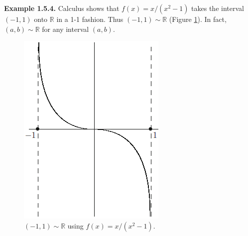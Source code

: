 \documentclass{article}
\begin{document}
        \textbf{Example 1.5.4.} Calculus shows that $f(x) = x/(x^2-1)$ takes the interval $(-1,1)$ onto $\mathbb{R}$ in a 1-1 fashion. Thus $(-1,1) \sim \mathbb{R}$ (Figure \ref{exp1.5.4}). In fact, $(a,b) \sim \mathbb{R}$ for any interval $(a,b)$.
        \begin{figure}[ht!]
            \centering
            \includegraphics[width=0.35\linewidth]{figs/exp1.5.4.png}
            \caption{$(-1,1) \sim \mathbb{R}$ using $f(x) = x/(x^2-1)$.}
            \label{exp1.5.4}
        \end{figure}
        
\end{document}
